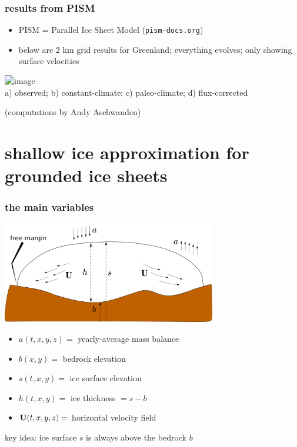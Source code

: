 \documentclass{beamer}
\begin{document}
\begin{frame}
  \frametitle{results from PISM}

\begin{itemize}
\item PISM = Parallel Ice Sheet Model (\texttt{pism-docs.org})
\item below are 2 km grid results for Greenland; everything evolves; only showing surface velocities
\end{itemize}

\vspace{-0.1in}
\begin{center}
    \includegraphics<1>[height=4.2cm]{speed_sar_pism_all} \\
   \footnotesize{a) observed; b) constant-climate; c) paleo-climate; d) flux-corrected}

\bigskip
\tiny (computations by Andy Aschwanden)
\end{center}
\end{frame}



\section[shallow ice approximation]{shallow ice approximation for grounded ice sheets}


\begin{frame}
  \frametitle{the main variables}

\begin{center}
\includegraphics[width=0.7\textwidth]{groundedscheme}
\end{center}

\begin{itemize}
\small
\item $a(t,x,y,z)=$ yearly-average mass balance
\item $b(x,y)=$ bedrock elevation
\item $s(t,x,y)=$ ice surface elevation
\item $h(t,x,y)=$ ice thickness $ = s-b$
\item ${\bf U}(t,x,y,z)=$ horizontal velocity field
\end{itemize}

\begin{alertblock}{key idea: ice surface $s$ is always above the bedrock $b$}
\end{alertblock}
\end{frame}
\end{document}
